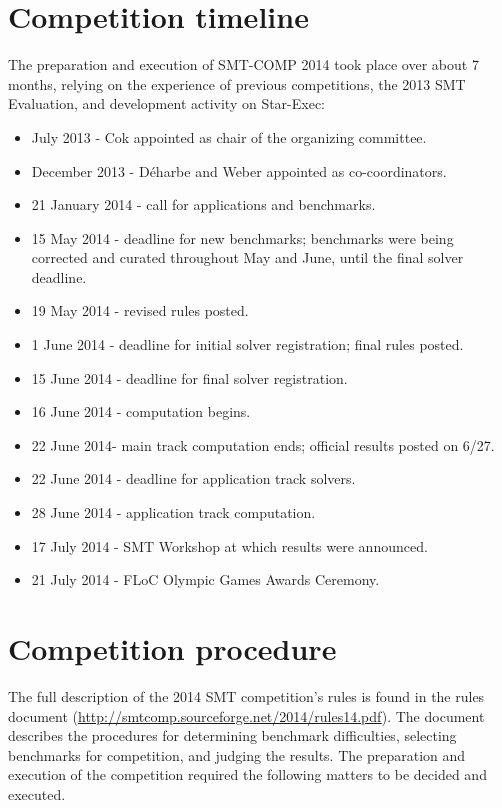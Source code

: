 \documentclass[twosize,11pt]{article}
\begin{document}
\section{Competition timeline}
\label{sec:timeline}

The preparation and execution of SMT-COMP 2014 took place over about 7 months, relying on the experience of previous competitions, the 2013 SMT Evaluation, and development activity on Star-Exec:
\begin{itemize}
\item July 2013 - Cok appointed as chair of the organizing committee.
\item December 2013 - D\'{e}harbe and Weber appointed as co-coordinators.
\item 21 January 2014 - call for applications and benchmarks.
\item 15 May 2014 - deadline for new benchmarks; benchmarks were being corrected and curated throughout May and June, until the final solver deadline.
\item 19 May 2014 - revised rules posted.
\item 1 June 2014 - deadline for initial solver registration; final rules posted.
\item 15 June 2014 - deadline for final solver registration.
\item 16 June 2014 - computation begins.
\item 22 June 2014- main track computation ends; official results posted on 6/27. 
\item 22 June 2014 - deadline for application track solvers.
\item 28 June 2014 - application track computation.
\item 17 July 2014 - SMT Workshop at which results were announced.
\item 21 July 2014 - FLoC Olympic Games Awards Ceremony.
\end{itemize}

\section{Competition procedure} 
\label{sec:procedure}


The full description of the 2014 SMT competition's rules is found in the rules document (\url{http://smtcomp.sourceforge.net/2014/rules14.pdf}). The document describes the procedures for determining benchmark difficulties, selecting benchmarks for competition, and judging the results. The preparation and execution of the competition required the following matters to be decided and executed.
\end{document}
